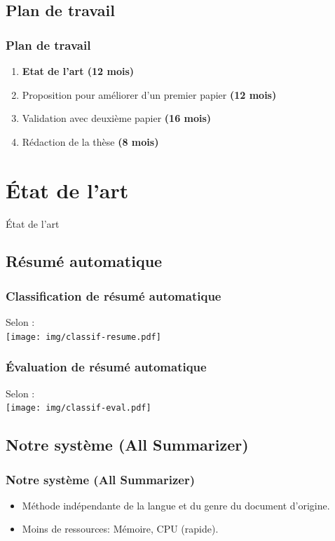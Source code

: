 \documentclass{beamer}
\begin{document}
\subsection{Plan de travail}
\begin{frame}
\frametitle{Plan de travail}

\begin{enumerate}
\item \textbf{\color{red} Etat de l’art \textbf{(12 mois)}}
\item Proposition pour améliorer d’un premier papier \textbf{(12 mois)}
\item Validation avec deuxième papier \textbf{(16 mois)}
\item Rédaction de la thèse \textbf{(8 mois)}
\end{enumerate}
\end{frame}

\section{\'Etat de l'art}
\begin{frame}
\begin{center}
{\Huge \'Etat de l'art}
\end{center}
\end{frame}

\subsection{Résumé automatique}

\begin{frame}
\frametitle{Classification de résumé automatique}
Selon \cite{99-sparckjones,98-hovy-lin}:\\
\texttt{[image: img/classif-resume.pdf]} %
\end{frame}

\begin{frame}
\frametitle{\'Evaluation de résumé automatique}
Selon \cite{01-mani}:\\
\texttt{[image: img/classif-eval.pdf]} %
\end{frame}

\subsection{Notre système (All Summarizer)}

\begin{frame}
\frametitle{Notre système (All Summarizer)}

\begin{itemize}
\item Méthode indépendante de la langue et du genre du document d'origine.
\item Moins de ressources: Mémoire, CPU (rapide).
\end{itemize}

\end{frame}
\end{document}
